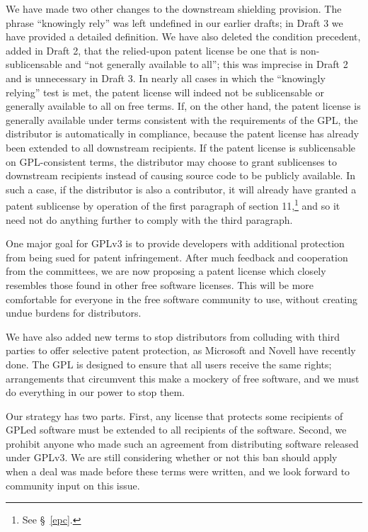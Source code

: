 We have made two other changes to the downstream shielding provision.
The phrase ``knowingly rely'' was left undefined in our earlier drafts;
in Draft 3 we have provided a detailed definition.  We have also deleted
the condition precedent, added in Draft 2, that the relied-upon patent
license be one that is non-sublicensable and ``not generally available
to all''; this was imprecise in Draft 2 and is unnecessary in Draft
3. In nearly all cases in which the ``knowingly relying'' test is met,
the patent license will indeed not be sublicensable or generally
available to all on free terms.  If, on the other hand, the patent
license is generally available under terms consistent with the
requirements of the GPL, the distributor is automatically in compliance,
because the patent license has already been extended to all downstream
recipients.  If the patent license is sublicensable on GPL-consistent
terms, the distributor may choose to grant sublicenses to downstream
recipients instead of causing source code to be publicly available.  In
such a case, if the distributor is also a contributor, it will already
have granted a patent sublicense by operation of the first paragraph of
section 11,\footnote{See \S\ \ref{epc}.} and so it need not do anything
further to comply with the third paragraph.


One major goal for GPLv3 is to provide developers with additional protection
from being sued for patent infringement.  After much feedback and cooperation
from the committees, we are now proposing a patent license which closely
resembles those found in other free software licenses.  This will be more
comfortable for everyone in the free software community to use, without
creating undue burdens for distributors.

We have also added new terms to stop distributors from colluding with third
parties to offer selective patent protection, as Microsoft and Novell have
recently done.  The GPL is designed to ensure that all users receive the
same rights; arrangements that circumvent this make a mockery of free
software, and we must do everything in our power to stop them.

Our strategy has two parts.  First, any license that protects some
recipients of GPLed software must be extended to all recipients of the
software.  Second, we prohibit anyone who made such an agreement from
distributing software released under GPLv3.  We are still considering
whether or not this ban should apply when a deal was made before these
terms were written, and we look forward to community input on this issue.

